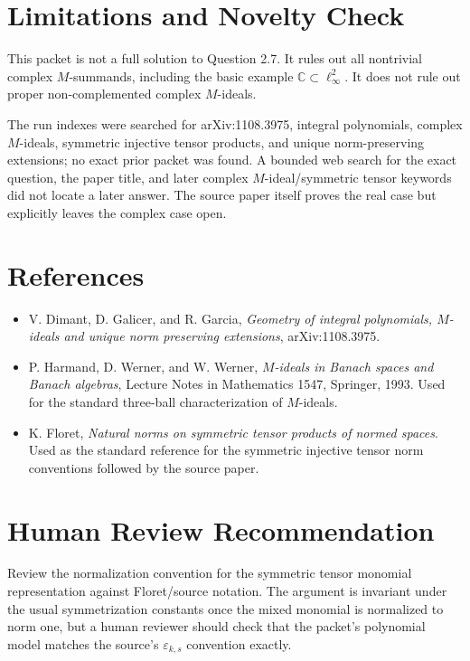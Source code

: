\documentclass[11pt]{article}
\newcommand{\C}{\mathbb C}
\begin{document}
\section*{Limitations and Novelty Check}

This packet is not a full solution to Question 2.7. It rules out all
nontrivial complex \(M\)-summands, including the basic example
\(\C\subset \ell_\infty^2\). It does not rule out proper non-complemented
complex \(M\)-ideals.

The run indexes were searched for arXiv:1108.3975, integral polynomials,
complex \(M\)-ideals, symmetric injective tensor products, and unique
norm-preserving extensions; no exact prior packet was found. A bounded web
search for the exact question, the paper title, and later complex
\(M\)-ideal/symmetric tensor keywords did not locate a later answer. The
source paper itself proves the real case but explicitly leaves the complex
case open.

\section*{References}

\begin{itemize}
\item V. Dimant, D. Galicer, and R. Garcia, \emph{Geometry of integral
polynomials, \(M\)-ideals and unique norm preserving extensions},
arXiv:1108.3975.
\item P. Harmand, D. Werner, and W. Werner, \emph{\(M\)-ideals in Banach
spaces and Banach algebras}, Lecture Notes in Mathematics 1547, Springer,
1993. Used for the standard three-ball characterization of \(M\)-ideals.
\item K. Floret, \emph{Natural norms on symmetric tensor products of normed
spaces}. Used as the standard reference for the symmetric injective tensor
norm conventions followed by the source paper.
\end{itemize}

\section*{Human Review Recommendation}

Review the normalization convention for the symmetric tensor monomial
representation against Floret/source notation. The argument is invariant under
the usual symmetrization constants once the mixed monomial is normalized to
norm one, but a human reviewer should check that the packet's polynomial model
matches the source's \(\varepsilon_{k,s}\) convention exactly.
\end{document}
